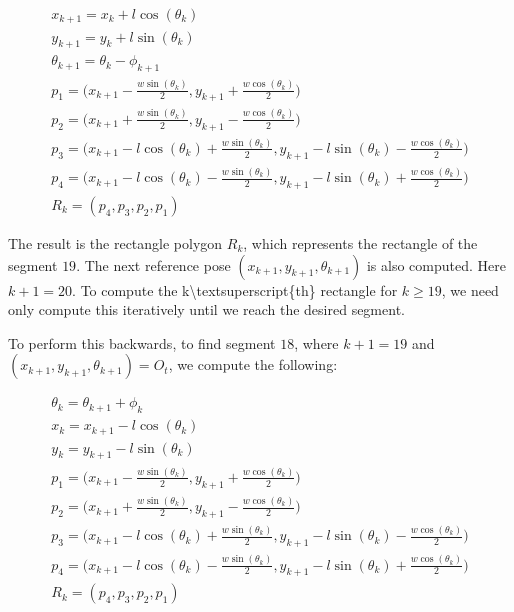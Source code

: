 \begin{equation}
\label{equ:rect1}
\begin{array}{l}
\displaystyle x_{k+1} = x_k + l \cos(\theta_k) \\
\displaystyle y_{k+1} = y_k + l \sin(\theta_k) \\
\displaystyle \theta_{k+1} = \theta_k - \phi_{k+1} \\
\displaystyle p_1 = \bigg( x_{k+1} - \frac{w\sin(\theta_k)}{2} , y_{k+1} + \frac{w\cos(\theta_k)}{2}\bigg) \\
\displaystyle p_2 = \bigg( x_{k+1} + \frac{w\sin(\theta_k)}{2}, y_{k+1} - \frac{w\cos(\theta_k)}{2} \bigg) \\
\displaystyle p_3 = \bigg( x_{k+1} - l\cos(\theta_k) + \frac{w\sin(\theta_k)}{2}, y_{k+1} - l\sin(\theta_k) - \frac{w\cos(\theta_k)}{2} \bigg) \\
\displaystyle p_4 = \bigg( x_{k+1} - l\cos(\theta_k) - \frac{w\sin(\theta_k)}{2}, y_{k+1} - l\sin(\theta_k) + \frac{w\cos(\theta_k)}{2} \bigg) \\
\displaystyle R_k = (p_4,p_3,p_2,p_1)
\end{array}
\end{equation}


The result is the rectangle polygon $R_k$, which represents the rectangle of the segment $19$. The next reference pose $(x_{k+1},y_{k+1},\theta_{k+1})$ is also computed. Here $k+1=20$. To compute the k\textbackslash{}textsuperscript\{th\} rectangle for $k \geq 19$, we need only compute this iteratively until we reach the desired segment.

To perform this backwards, to find segment $18$, where $k+1=19$ and $(x_{k+1}, y_{k+1}, \theta_{k+1}) = O_t$, we compute the following:


\begin{equation}
\label{equ:rect2}
\begin{array}{l}
\displaystyle \theta_k = \theta_{k+1} + \phi_k \\
\displaystyle x_k = x_{k+1} - l \cos(\theta_k) \\ 
\displaystyle y_k = y_{k+1} - l \sin(\theta_k) \\
\displaystyle p_1 = \bigg( x_{k+1} - \frac{w\sin(\theta_k)}{2} , y_{k+1} + \frac{w\cos(\theta_k)}{2}\bigg) \\
\displaystyle p_2 = \bigg( x_{k+1} + \frac{w\sin(\theta_k)}{2}, y_{k+1} - \frac{w\cos(\theta_k)}{2} \bigg) \\
\displaystyle p_3 = \bigg( x_{k+1} - l\cos(\theta_k) + \frac{w\sin(\theta_k)}{2}, y_{k+1} - l\sin(\theta_k) - \frac{w\cos(\theta_k)}{2} \bigg) \\
\displaystyle p_4 = \bigg( x_{k+1} - l\cos(\theta_k) - \frac{w\sin(\theta_k)}{2}, y_{k+1} - l\sin(\theta_k) + \frac{w\cos(\theta_k)}{2} \bigg) \\ 
\displaystyle R_k = (p_4,p_3,p_2,p_1)
\end{array}
\end{equation}


